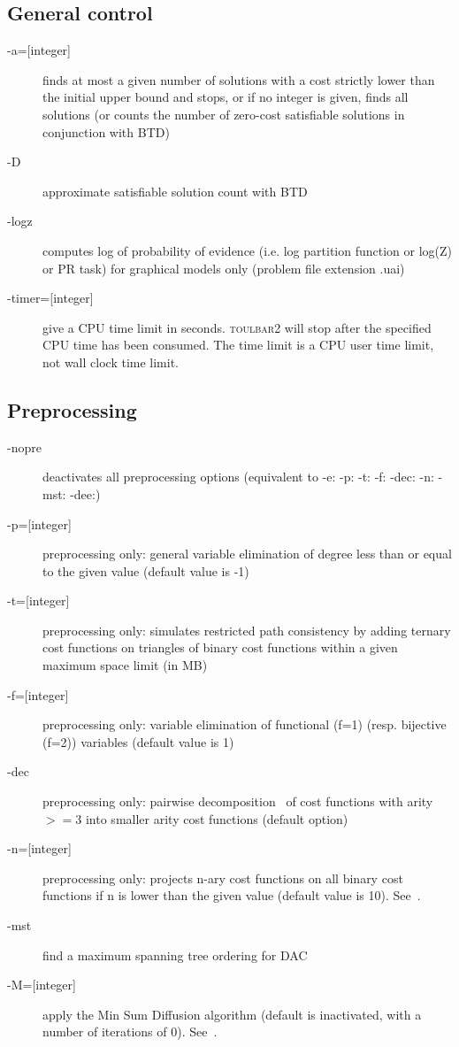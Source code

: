 \documentclass{article}
\def\toulbar2{\textsc{toulbar2}}
\begin{document}
\subsection{General control}

\begin{description}
\item[{-a=[integer]}] finds at most a given number of solutions with a cost strictly lower than the initial upper bound and stops, 
or if no integer is given, finds all solutions (or counts the number of zero-cost satisfiable solutions in conjunction with BTD)
\item[{-D}] approximate satisfiable solution count with BTD
\item[{-logz}] computes log of probability of evidence (i.e. log
  partition function or log(Z) or PR task) for graphical models only
  (problem file extension .uai)
\item[{-timer=[integer]}] give a CPU time limit in seconds. \toulbar2
  will stop after the specified CPU time has been consumed. The time
  limit is a CPU user time limit, not wall clock time limit.
\end{description}
 
\subsection{Preprocessing}

\begin{description}
\item[{-nopre}] deactivates all preprocessing options (equivalent to -e:
  -p: -t: -f: -dec: -n: -mst: -dee:)
\item[{-p=[integer]}]preprocessing only: general variable elimination
  of degree less than or equal to the given value (default value is
  -1)
\item[{-t=[integer]}] preprocessing only: simulates restricted path
  consistency by adding ternary cost functions on triangles of binary
  cost functions within a given maximum space limit (in MB)
\item[{-f=[integer]}] preprocessing only: variable elimination of
  functional (f=1) (resp. bijective (f=2)) variables (default value is
  1)
\item[{-dec}] preprocessing only: pairwise decomposition~\cite{Favier11a} of cost
  functions with arity $>=3$ into smaller arity cost functions (default
  option)
\item[{-n=[integer]}] preprocessing only: projects n-ary cost functions
  on all binary cost functions if n is lower than the given value
  (default value is 10). See~\cite{Favier11a}.
\item[{-mst}] find a maximum spanning tree ordering for DAC
\item[{-M=[integer]}]
  apply the Min Sum Diffusion algorithm (default is inactivated, with
  a number of iterations of 0). See~\cite{Cooper10a}.
 \end{description}
 
\end{document}
